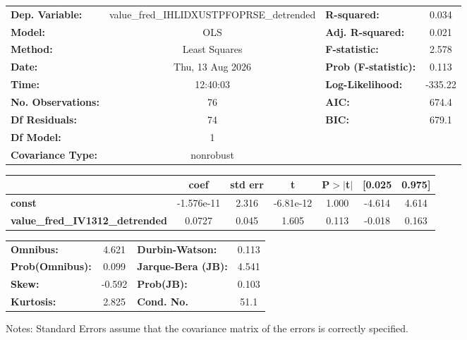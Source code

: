 \begin{center}
\begin{tabular}{lclc}
\toprule
\textbf{Dep. Variable:}                 & value\_fred\_IHLIDXUSTPFOPRSE\_detrended & \textbf{  R-squared:         } &     0.034   \\
\textbf{Model:}                         &                   OLS                    & \textbf{  Adj. R-squared:    } &     0.021   \\
\textbf{Method:}                        &              Least Squares               & \textbf{  F-statistic:       } &     2.578   \\
\textbf{Date:}                          &             Thu, 13 Aug 2026             & \textbf{  Prob (F-statistic):} &    0.113    \\
\textbf{Time:}                          &                 12:40:03                 & \textbf{  Log-Likelihood:    } &   -335.22   \\
\textbf{No. Observations:}              &                      76                  & \textbf{  AIC:               } &     674.4   \\
\textbf{Df Residuals:}                  &                      74                  & \textbf{  BIC:               } &     679.1   \\
\textbf{Df Model:}                      &                       1                  & \textbf{                     } &             \\
\textbf{Covariance Type:}               &                nonrobust                 & \textbf{                     } &             \\
\bottomrule
\end{tabular}
\begin{tabular}{lcccccc}
                                        & \textbf{coef} & \textbf{std err} & \textbf{t} & \textbf{P$> |$t$|$} & \textbf{[0.025} & \textbf{0.975]}  \\
\midrule
\textbf{const}                          &   -1.576e-11  &        2.316     & -6.81e-12  &         1.000        &       -4.614    &        4.614     \\
\textbf{value\_fred\_IV1312\_detrended} &       0.0727  &        0.045     &     1.605  &         0.113        &       -0.018    &        0.163     \\
\bottomrule
\end{tabular}
\begin{tabular}{lclc}
\textbf{Omnibus:}       &  4.621 & \textbf{  Durbin-Watson:     } &    0.113  \\
\textbf{Prob(Omnibus):} &  0.099 & \textbf{  Jarque-Bera (JB):  } &    4.541  \\
\textbf{Skew:}          & -0.592 & \textbf{  Prob(JB):          } &    0.103  \\
\textbf{Kurtosis:}      &  2.825 & \textbf{  Cond. No.          } &     51.1  \\
\bottomrule
\end{tabular}
\end{center}

Notes: \newline
 [1] Standard Errors assume that the covariance matrix of the errors is correctly specified.